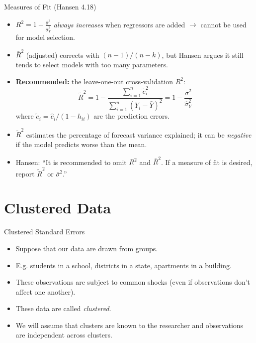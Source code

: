 \documentclass[aspectratio=169, handout, t]{beamer}
\numberwithin{equation}{section}
\begin{document}
\begin{frame}{Measures of Fit (Hansen 4.18)}
\begin{itemize}
\item $R^2=1-\frac{\hat{\sigma}^2}{\hat{\sigma}_Y^2}$ \emph{always increases} when regressors are added $\rightarrow$ cannot be used for model selection. \pause
\item $\bar{R}^2$ (adjusted) corrects with $(n-1)/(n-k)$, but Hansen argues it still tends to select models with too many parameters. \pause
\item \textbf{Recommended:} the leave-one-out cross-validation $R^2$:
$$\tilde{R}^2=1-\frac{\sum_{i=1}^n\tilde{e}_i^2}{\sum_{i=1}^n(Y_i-\bar{Y})^2}=1-\frac{\bar{\sigma}^2}{\hat{\sigma}_Y^2}$$
where $\tilde{e}_i=\hat{e}_i/(1-h_{ii})$ are the prediction errors. \pause
\item $\tilde{R}^2$ estimates the percentage of forecast variance explained; it can be \emph{negative} if the model predicts worse than the mean. \pause
\item Hansen: ``It is recommended to omit $R^2$ and $\bar{R}^2$.  If a measure of fit is desired, report $\tilde{R}^2$ or $\bar{\sigma}^2$.''
\end{itemize}
\end{frame}


\section{Clustered Data}
\begin{frame}{Clustered Standard Errors}
\begin{itemize}
\item Suppose that our data are drawn from groups.
\item[] E.g. students in a school, districts in a state, apartments in a building.
\item These observations are subject to common shocks (even if observations don't affect one another).
\item These data are called \emph{clustered}.
\item We will assume that clusters are known to the researcher and observations are independent across clusters.
\end{itemize}
\end{frame}
\end{document}

